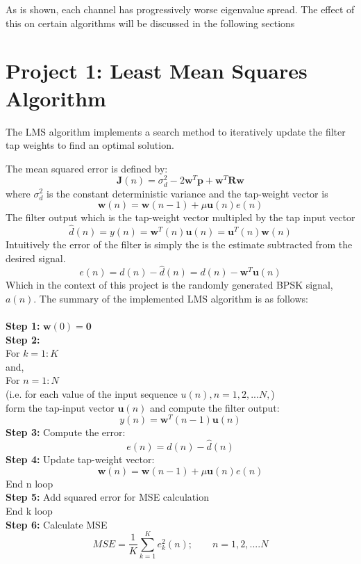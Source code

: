 \documentclass[journal]{IEEEtran}
\begin{document}
As is shown, each channel has progressively worse eigenvalue spread. The effect
of this on certain algorithms will be discussed in the following sections

\section{Project 1: Least Mean Squares Algorithm}
The LMS algorithm implements a search method to iteratively update the
filter tap weights to find an optimal solution.

The mean squared error is defined by:
$$\boldsymbol{J}(n) = \sigma^2_d - 2\boldsymbol{w}^T\boldsymbol{p} + \boldsymbol{w}^T\boldsymbol{R}\boldsymbol{w}$$ where
$\sigma^2_d$ is the constant deterministic variance and the tap-weight vector is
$$ \boldsymbol{w}(n)= \boldsymbol{w}(n-1)+\mu\boldsymbol{u}(n)e(n)$$
The filter output which is the tap-weight vector multipled by the tap input vector
$$\hat{d}(n) = y(n) = \boldsymbol{w}^T(n)\boldsymbol{u}(n) = \boldsymbol{u}^T(n)\boldsymbol{w}(n)$$
Intuitively the error of the filter is simply the is the estimate subtracted from the desired signal.
$$e(n) = d(n) - \hat{d}(n) = d(n) - \boldsymbol{w}^T\boldsymbol{u}(n)$$
Which in the context of this project is the randomly generated BPSK signal, $a(n)$. The summary of the implemented LMS algorithm is as follows:\\
\\
\textbf{Step 1:} $\boldsymbol{w}(0) = \boldsymbol{0} $\\
\textbf{Step 2:}\\
For $k = 1:K$\\
and,\\
For $n = 1:N$\\
(i.e. for each value of the input sequence $u(n), n = 1,2,...N,$)
\\ \indent form the tap-input vector $\boldsymbol{u}(n)$ and compute the filter output:
\begin{equation}
  y(n) = \boldsymbol{w}^T(n-1)\boldsymbol{u}(n)
\end{equation}
\indent \textbf{Step 3:} Compute the error:
\begin{equation}
  e(n) = d(n) - \hat{d}(n)
\end{equation}
\indent \textbf{Step 4:} Update tap-weight vector:
\begin{equation}
  \boldsymbol{w}(n)= \boldsymbol{w}(n-1)+\mu\boldsymbol{u}(n)e(n)
\end{equation}
End n loop\\
\textbf{Step 5:} Add squared error for MSE calculation\\
End k loop\\
\textbf{Step 6:} Calculate MSE
\begin{equation}
  \label{eq:MSE}
  MSE=\dfrac{1}{K}\sum_{k=1}^{K}e_k^2(n); \qquad n = 1,2,....N
\end{equation}
\end{document}
